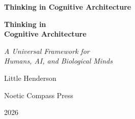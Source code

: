 
\frontmatter
\pagestyle{plainbook}

\thispagestyle{empty}
\begin{center}
  \vspace*{2.5in}
  {\huge\bfseries Thinking in Cognitive Architecture\par}
\end{center}
\cleardoublepage

\thispagestyle{empty}
\begin{center}
  \vspace*{1.5in}
  {\Huge\bfseries Thinking in\\[0.15in] Cognitive Architecture\par}
  \vspace{0.75in}
  {\Large\itshape A Universal Framework for\\[0.08in] Humans, AI, and Biological Minds\par}
  \vspace{1.75in}
  {\Large Little Henderson\par}
  \vfill
  {\normalsize Noetic Compass Press\par}
  {\small 2026\par}
\end{center}
\clearpage


